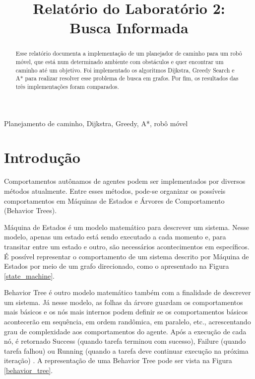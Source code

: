 \documentclass[conference]{IEEEtran}
\begin{document}
\title{Relatório do Laboratório 2: \\ Busca Informada\\
}

\author{
}

\maketitle

\begin{abstract}
Esse relatório documenta a implementação de um planejador de caminho para um robô móvel, que está num determinado ambiente com obstáculos e quer encontrar um caminho até um objetivo. Foi implementado os algoritmos Dijkstra, Greedy Search e A* para realizar resolver esse problema de busca em grafos. Por fim, os resultados das três implementações foram comparados.
\end{abstract}

\begin{IEEEkeywords}
Planejamento de caminho, Dijkstra, Greedy, A*, robô móvel
\end{IEEEkeywords}

\section{Introdução}
Comportamentos autônamos de agentes podem ser implementados por diversos métodos atualmente. Entre esses métodos, pode-se organizar os possíveis comportamentos em Máquinas de Estados e Árvores de Comportamento (Behavior Trees).

Máquina de Estados é um modelo matemático para descrever um sistema. Nesse modelo, apenas um estado está sendo executado a cada momento e, para transitar entre um estado e outro, são necessários acontecimentos em específicos\cite{b1}. É possível representar o comportamento de um sistema descrito por Máquina de Estados por meio de um grafo direcionado, como o apresentado na Figura \ref{state_machine}.

Behavior Tree é outro modelo matemático também com a finalidade de descrever um sistema. Já nesse modelo, as folhas da árvore guardam os comportamentos mais básicos e os nós mais internos podem definir se os comportamentos básicos acontecerão em sequência, em ordem randômica, em paralelo, etc., acrescentando grau de complexidade aos comportamentos do agente. Após a execução de cada nó, é retornado Success (quando tarefa terminou com sucesso), Failure (quando tarefa falhou) ou Running (quando a tarefa deve continuar execução na próxima iteração) \cite{b1}. A representação de uma Behavior Tree pode ser vista na Figura \ref{behavior_tree}.
\end{document}

